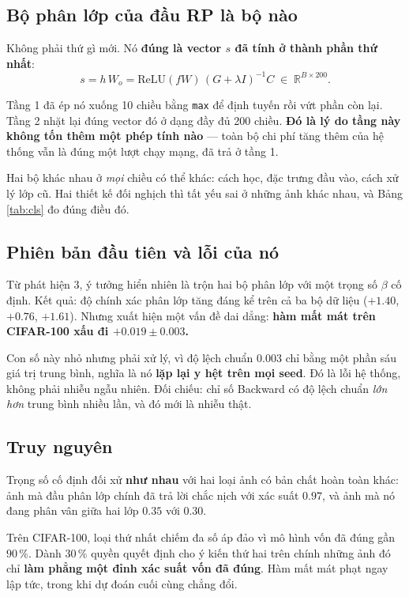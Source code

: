 \documentclass[11pt,a4paper]{article}
\begin{document}
\subsection{Bộ phân lớp của đầu RP là bộ nào}

Không phải thứ gì mới. Nó \textbf{đúng là vector $s$ đã tính ở thành phần thứ
nhất}:
\[ s = h\,W_o = \mathrm{ReLU}(fW)\,(G + \lambda I)^{-1} C \;\in\; \mathbb{R}^{B \times 200} . \]

Tầng 1 đã ép nó xuống 10 chiều bằng \texttt{max} để định tuyến rồi vứt phần còn
lại. Tầng 2 nhặt lại đúng vector đó ở dạng đầy đủ 200 chiều. \textbf{Đó là lý do
tầng này không tốn thêm một phép tính nào} --- toàn bộ chi phí tăng thêm của hệ
thống vẫn là đúng một lượt chạy mạng, đã trả ở tầng 1.

Hai bộ khác nhau ở \emph{mọi} chiều có thể khác: cách học, đặc trưng đầu vào,
cách xử lý lớp cũ. Hai thiết kế đối nghịch thì tất yếu sai ở những ảnh khác nhau,
và Bảng \ref{tab:cls} đo đúng điều đó.

\subsection{Phiên bản đầu tiên và lỗi của nó}

Từ phát hiện 3, ý tưởng hiển nhiên là trộn hai bộ phân lớp với một trọng số
$\beta$ cố định. Kết quả: độ chính xác phân lớp tăng đáng kể trên cả ba bộ dữ
liệu ($+1.40$, $+0.76$, $+1.61$). Nhưng xuất hiện một vấn đề dai dẳng:
\textbf{hàm mất mát trên CIFAR-100 xấu đi $+0.019 \pm 0.003$.}

Con số này nhỏ nhưng phải xử lý, vì độ lệch chuẩn $0.003$ chỉ bằng một phần sáu
giá trị trung bình, nghĩa là nó \textbf{lặp lại y hệt trên mọi seed}. Đó là lỗi
hệ thống, không phải nhiễu ngẫu nhiên. Đối chiếu: chỉ số Backward có độ lệch
chuẩn \emph{lớn hơn} trung bình nhiều lần, và đó mới là nhiễu thật.

\subsection{Truy nguyên}

Trọng số cố định đối xử \textbf{như nhau} với hai loại ảnh có bản chất hoàn toàn
khác: ảnh mà đầu phân lớp chính đã trả lời chắc nịch với xác suất $0.97$, và ảnh
mà nó đang phân vân giữa hai lớp $0.35$ với $0.30$.

Trên CIFAR-100, loại thứ nhất chiếm đa số áp đảo vì mô hình vốn đã đúng gần
$90\,\%$. Dành $30\,\%$ quyền quyết định cho ý kiến thứ hai trên chính những ảnh
đó chỉ \textbf{làm phẳng một đỉnh xác suất vốn đã đúng}. Hàm mất mát phạt ngay
lập tức, trong khi dự đoán cuối cùng chẳng đổi.
\end{document}
